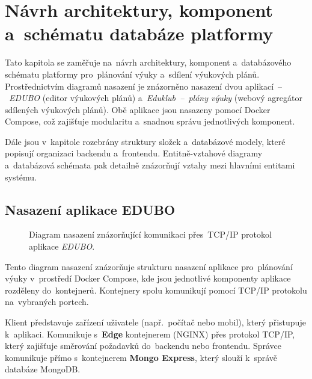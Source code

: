 \documentclass[male,czech,api_bc]{kitheses}
\begin{document}
\section{Návrh architektury, komponent a~schématu databáze platformy}

Tato kapitola se zaměřuje na~návrh architektury, komponent a~databázového schématu platformy pro~plánování výuky a~sdílení výukových plánů. Prostřednictvím diagramů nasazení je znázorněno nasazení dvou aplikací~--~\textit{EDUBO} (editor výukových plánů) a~\textit{Eduklub~--~plány výuky} (webový agregátor sdílených výukových plánů). Obě aplikace jsou nasazeny pomocí Docker Compose, což zajišťuje modularitu a~snadnou správu jednotlivých komponent.

Dále jsou v~kapitole rozebrány struktury složek a~databázové modely, které popisují organizaci backendu a~frontendu. Entitně-vztahové diagramy a~databázová schémata pak detailně znázorňují vztahy mezi hlavními entitami systému.

\subsection{Nasazení aplikace EDUBO}

\begin{figure}[H]
	\centering
	\caption{Diagram nasazení znázorňující komunikaci přes~TCP/IP protokol aplikace \textit{EDUBO}.}
	\label{fig:deployment-diagram-1}
\end{figure}

Tento diagram nasazení znázorňuje strukturu nasazení aplikace pro~plánování výuky v~prostředí Docker Compose, kde jsou jednotlivé komponenty aplikace rozděleny do~kontejnerů. Kontejnery spolu komunikují pomocí TCP/IP protokolu na~vybraných portech.

Klient představuje zařízení uživatele (např.~počítač nebo mobil), který přistupuje k~aplikaci. Komunikuje s~\textbf{Edge} kontejnerem (NGINX) přes protokol TCP/IP, který zajišťuje směrování požadavků do~backendu nebo frontendu. Správce komunikuje přímo s~kontejnerem \textbf{Mongo Express}, který slouží k~správě databáze MongoDB.
\end{document}
